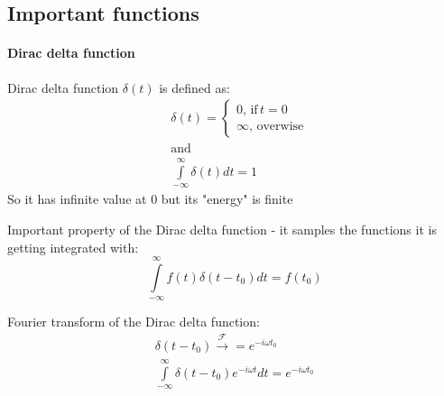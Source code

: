 \documentclass{article}
\begin{document}
\subsection{Important functions}

\paragraph{Dirac delta function}

Dirac delta function $\delta(t)$ is defined as:
\begin{align*}
    &\delta(t) = \begin{cases}
        0, \, \text{if} \, t=0 \\
        \infty, \, \text{overwise}
    \end{cases} \\
    &\text{and} \\
    &\int \limits^{\infty}_{-\infty} \delta(t) dt = 1
\end{align*}
So it has infinite value at $0$ but its "energy" is finite

Important property of the Dirac delta function - it samples the functions it is getting integrated with:
\begin{equation*}
    \int \limits^{\infty}_{-\infty} f(t) \delta(t-t_0) dt = f(t_0)
\end{equation*}

Fourier transform of the Dirac delta function:
\begin{align*}
    \delta(t-t_0) \xrightarrow{\mathcal{F}} = e^{-i \omega t_0} \\
    \int \limits^{\infty}_{-\infty} \delta(t-t_0) e^{-i \omega t} dt = e^{-i \omega t_0}
\end{align*}

\newcommand{\DrawAxes}[7]{
    \coordinate (x_dir) at (1,0);
    \coordinate (y_dir) at (0,1);
    \coordinate (center) at #1;
    \def\mx{#2};
    \def\px{#3};
    \def\my{#4};
    \def\py{#5};
    \draw[->, thick] ($ (center) - \mx *(x_dir) $) -- ($ (center) + \px *(x_dir) $) node [below right] {#6};
    \draw[->, thick] ($ (center) - \my *(y_dir) $) -- ($ (center) + \py *(y_dir) $) node [above right] {#7};
}

\newcommand{\DrawDiracDelta}[2] {
    \coordinate (center) at #1;
    \coordinate (dir) at #2;
    \coordinate (end) at ($ (center) + (dir) $);
    \coordinate (pos) at (center-|end);
    \draw[->, thick] (pos) -| (end);
}
\end{document}
